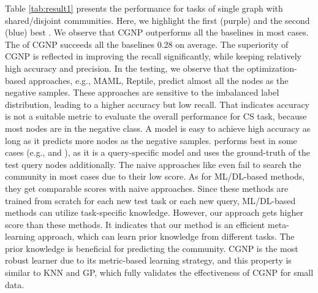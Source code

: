 Table \ref{tab:result1} presents the performance for tasks of single
graph with shared/disjoint communities. Here, we
highlight the first (purple) and the second (blue) best \Fone.
We observe that CGNP outperforms all the baselines in most cases.
%
The \Fone of CGNP succeeds all the baselines 0.28 on average.
%
The superiority of CGNP is reflected in improving the recall
significantly, while keeping relatively high accuracy and precision.
In the testing, we observe that the optimization-based approaches, e.g., MAML, Reptile, predict almost all the nodes as the negative samples.  These approaches are sensitive to the imbalanced label distribution, leading to a higher accuracy but low recall. 
That indicates accuracy is not a suitable metric to evaluate the overall performance for CS task, because most nodes are in the negative class. A model is easy to achieve high accuracy as long as it predicts more nodes as the negative samples.
\ICSGNN performs best in some cases (e.g., \DBLP and \Facebook), as it
is a query-specific model and uses the ground-truth of the test query
nodes additionally.  The naive approaches like \Featrans even fail to
search the community in most cases due to their low \Fone score. As
for ML/DL-based methods, they get comparable scores with naive
approaches. Since these methods are trained from scratch for each new
test task or each new query, ML/DL-based methods can utilize
task-specific knowledge. However, our approach gets higher score than
these methods. It indicates that our method is an efficient
meta-learning approach, which can learn prior knowledge from different
tasks. The prior knowledge is beneficial for predicting the
community. CGNP is the most robust learner due to its metric-based
learning strategy, and this property is similar to KNN and GP, which
fully validates the effectiveness of CGNP for small data.


